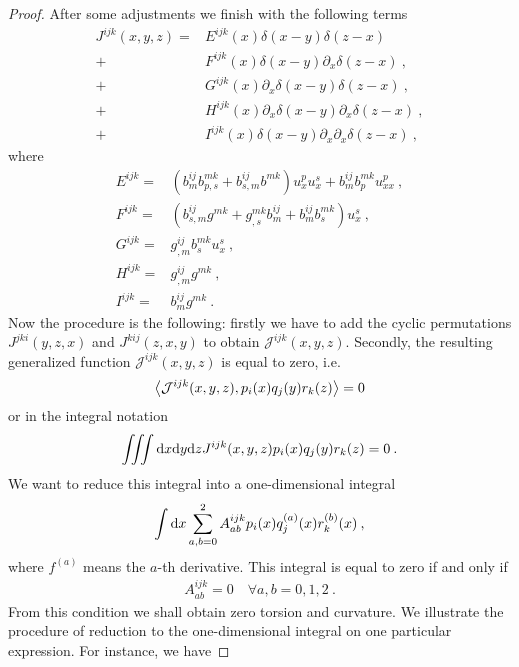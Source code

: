 \begin{proof}
    After some adjustments we finish with the following terms
    \begin{align}
        J^{ijk}(x,y,z) =& 
        E^{ijk}(x) \delta(x-y) \delta(z-x) 
        \\+& F^{ijk}(x) \delta(x-y) \partial_x \delta(z-x) \:,
        \\+& G^{ijk}(x) \partial_x \delta(x-y) \delta (z-x) \:,
        \\+& H^{ijk}(x) \partial_x \delta(x-y) \partial_x \delta (z-x) \:,
        \\+& I^{ijk}(x) \delta(x-y) \partial_x \partial_x \delta (z-x) \:,
    \end{align}
    where
    \begin{align}
        E^{ijk} =& (b^{ij}_m b^{mk}_{p,s} + b^{ij}_{s,m} b^{mk} ) u^p_x u^s_x + b^{ij}_m b^{mk}_p u^p_{xx} \:, \\
        F^{ijk} =& (b^{ij}_{s,m} g^{mk} + g^{mk}_{,s} b^{ij}_m + b^{ij}_m b^{mk}_s)u_x^s \:, \\
        G^{ijk} =& g^{ij}_{,m} b^{mk}_s u^s_x \:,\\
        H^{ijk} =& g^{ij}_{,m} g^{mk} \:,\\
        I^{ijk} =& b^{ij}_m g^{mk} \:.
    \end{align}
    Now the procedure is the following: firstly we have to add the cyclic permutations $J^{jki}(y,z,x)$ and $J^{kij}(z,x,y)$ to obtain $\mathcal J^{ijk}(x,y,z)$. Secondly, the resulting generalized function $\mathcal J^{ijk}(x,y,z)$ is equal to zero, i.e.
    \begin{align}
        \left \langle \mathcal J^{ijk}(x,y,z) ,p_i(x)q_j(y)r_k(z) \right \rangle = 0
    \end{align}
    or in the integral notation 
    \begin{align}
        \iiint \mathrm{d} x \mathrm{d} y \mathrm{d} z J^{ijk}(x,y,z) p_i(x)q_j(y)r_k(z) = 0 \:.
    \end{align}
    We want to reduce this integral into a one-dimensional integral
    \begin{align}
        \int \mathrm{d} x \sum_{a,b = 0}^2 A^{ijk}_{ab} p_i(x) q^{(a)}_j(x) r^{(b)}_k (x) \:,
    \end{align}
    where $f^{(a)}$ means the $a$-th derivative. This integral is equal to zero if and only if
    \begin{align}
        A^{ijk}_{ab} = 0 \quad \forall a,b = 0,1,2 \:.
    \end{align}
    From this condition we shall obtain zero torsion and curvature.
    We illustrate the procedure of reduction to the one-dimensional integral on one particular expression. For instance, we have

\end{proof}
